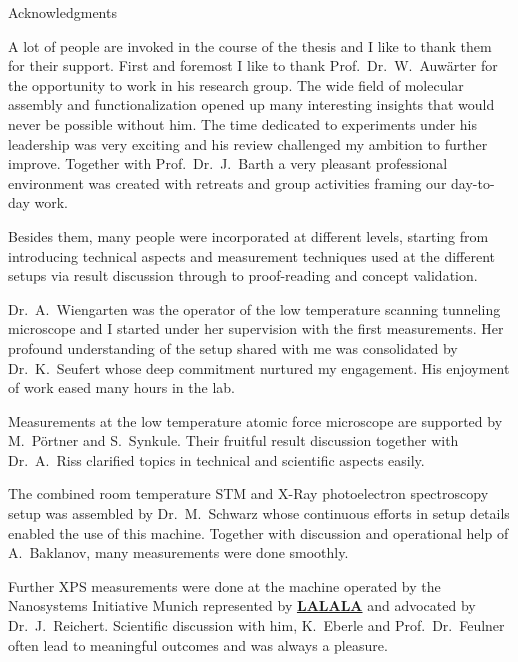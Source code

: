 \thispagestyle{empty}
\begin{center}
{ Acknowledgments}
\end{center}
\vspace{1cm}
A lot of people are invoked in the course of the thesis and I like to thank them for their support. First and foremost I like to thank Prof.\ Dr.\ W.\ Auw\"arter for the opportunity to work in his research group. The wide field of molecular assembly and functionalization opened up many interesting insights that would never be possible without him. The time dedicated to experiments under his leadership was very exciting and his review challenged my ambition to further improve. Together with Prof.\ Dr.\ J.\ Barth a very pleasant professional environment was created with retreats and group activities framing our day-to-day work.

Besides them, many people were incorporated at different levels, starting from introducing technical aspects and measurement techniques used at the different setups via result discussion through to proof-reading and concept validation. 

	Dr.\ A.\ Wiengarten was the operator of the low temperature scanning tunneling microscope and I started under her supervision with the first measurements. Her profound understanding of the setup shared with me was consolidated by Dr.\ K.\ Seufert whose deep commitment nurtured my engagement. His enjoyment of work eased many hours in the lab.

	Measurements at the low temperature atomic force microscope are supported by M.\ P\"ortner and S.\ Synkule. Their fruitful result discussion together with Dr.\ A.\ Riss clarified topics in technical and scientific aspects easily.

	The combined room temperature STM and X-Ray photoelectron spectroscopy setup was assembled by Dr.\ M.\ Schwarz whose continuous efforts in setup details enabled the use of this machine. Together with discussion and operational help of A.\ Baklanov, many measurements were done smoothly.

	Further XPS measurements were done at the machine operated by the Nanosystems Initiative Munich represented by \textbf{\underline{LALALA}} and advocated by Dr.\ J.\ Reichert. Scientific discussion with him, K.\ Eberle and Prof.\ Dr.\ Feulner often lead to meaningful outcomes and was always a pleasure.

